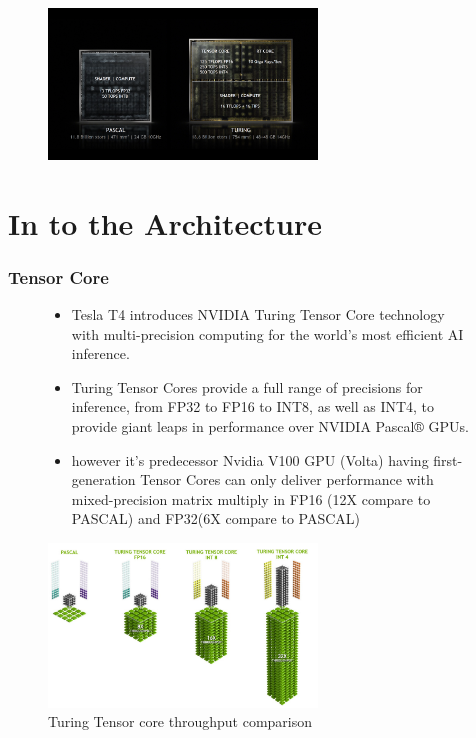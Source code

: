 \documentclass[xcolor=x11names,table]{beamer}
\begin{document}
	\begin{frame}
		\begin{figure}[H]
			\includegraphics[width=270px]{refs/NVIDIA-RTX-Turing-GPU_19-1}
		\end{figure}
	\end{frame}

\section{In to the Architecture}
	\begin{frame}[allowframebreaks]
		\frametitle{Tensor Core}
		\begin{figure}[H]
			\begin{itemize}
				\item Tesla T4 introduces NVIDIA Turing Tensor Core technology with multi-precision computing for the world’s most efficient AI inference. 
				
				\item Turing Tensor Cores provide a full range of precisions for inference, from FP32 to FP16 to INT8, as well as INT4, to provide giant leaps in performance over NVIDIA Pascal® GPUs.
				
				\item however it's predecessor Nvidia V100 GPU (Volta) having first-generation Tensor Cores can only deliver performance with mixed-precision matrix multiply in FP16 (12X compare to PASCAL) and FP32(6X compare to PASCAL)
			\end{itemize}
			\includegraphics[width=270px]{refs/turing-throughput-tensor.jpg}
			\caption{Turing Tensor core throughput comparison}
		\end{figure}
	\end{frame}
\end{document}
